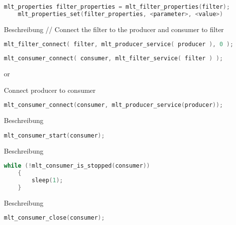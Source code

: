 \documentclass[../MasterThesis.tex]{subfiles}
\begin{document}
\begin{description}[font=\normalfont\color{RedViolet!80!black}, style=nextline]
	\begin{lstlisting}[language=C, numbers=none, basicstyle=\scriptsize\ttfamily]
	mlt_properties filter_properties = mlt_filter_properties(filter);
	mlt_properties_set(filter_properties, <parameter>, <value>) \end{lstlisting}
	
	
	\item[Connect elements] Beschreibung
	// Connect the filter to the producer and consumer to filter
	
	\begin{lstlisting}[language=C, numbers=none, basicstyle=\scriptsize\ttfamily]
	mlt_filter_connect( filter, mlt_producer_service( producer ), 0 ); \end{lstlisting}
	
	\begin{lstlisting}[language=C, numbers=none, basicstyle=\scriptsize\ttfamily]
	mlt_consumer_connect( consumer, mlt_filter_service( filter ) ); \end{lstlisting}
	
	
	or 
	
	Connect producer to consumer
	
	\begin{lstlisting}[language=C, numbers=none, basicstyle=\scriptsize\ttfamily]
	mlt_consumer_connect(consumer, mlt_producer_service(producer)); \end{lstlisting}
	
	\item[Start consumer] Beschreibung
	
	\begin{lstlisting}[language=C, numbers=none, basicstyle=\scriptsize\ttfamily]
	mlt_consumer_start(consumer);	\end{lstlisting}
	
	\item[Wait for consumer to terminate???] Beschreibung
	
	\begin{lstlisting}[language=C, numbers=none, basicstyle=\scriptsize\ttfamily]
	while (!mlt_consumer_is_stopped(consumer)) 
	{
		sleep(1);
	} \end{lstlisting}
	
	\item[Close the consumer] Beschreibung
	
	\begin{lstlisting}[language=C, numbers=none, basicstyle=\scriptsize\ttfamily]
	 mlt_consumer_close(consumer); \end{lstlisting}
	

\end{description}
\end{document}
